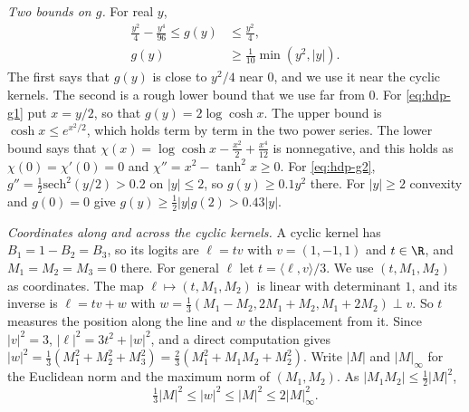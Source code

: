 \emph{Two bounds on $g$.} For real $y$,
\begin{align}
 \frac{y^2}4-\frac{y^4}{96}\le g(y)&\le\frac{y^2}4,\tag{g1}\label{eq:hdp-g1}\\
 g(y)&\ge\frac1{10}\min(y^2,|y|).\tag{g2}\label{eq:hdp-g2}
\end{align}
The first says that $g(y)$ is close to $y^2/4$ near $0$, and we use it near
the cyclic kernels. The second is a rough lower bound that we use far from
$0$. For \eqref{eq:hdp-g1} put $x=y/2$, so that $g(y)=2\log\cosh x$. The upper
bound is $\cosh x\le e^{x^2/2}$, which holds term by term in the two power
series. The lower bound says that
$\chi(x)=\log\cosh x-\frac{x^2}2+\frac{x^4}{12}$ is nonnegative, and this holds
as $\chi(0)=\chi'(0)=0$ and $\chi''=x^2-\tanh^2x\ge0$. For \eqref{eq:hdp-g2},
$g''=\frac12\mathrm{sech}^2(y/2)>0.2$ on $|y|\le2$, so $g(y)\ge0.1y^2$ there.
For $|y|\ge2$ convexity and $g(0)=0$ give $g(y)\ge\frac12|y|g(2)>0.43|y|$.

\emph{Coordinates along and across the cyclic kernels.} A cyclic kernel has
$B_1=1-B_2=B_3$, so its logits are $\ell=tv$ with $v=(1,-1,1)$ and $t\in\R$,
and $M_1=M_2=M_3=0$ there. For general $\ell$ let $t=\langle\ell,v\rangle/3$.
We use $(t,M_1,M_2)$ as coordinates. The map $\ell\mapsto(t,M_1,M_2)$ is
linear with determinant $1$, and its inverse is $\ell=tv+w$ with
$w=\frac13(M_1-M_2,2M_1+M_2,M_1+2M_2)\perp v$. So $t$ measures the position
along the line and $w$ the displacement from it. Since $|v|^2=3$,
$|\ell|^2=3t^2+|w|^2$, and a direct computation gives
$|w|^2=\frac13(M_1^2+M_2^2+M_3^2)=\frac23(M_1^2+M_1M_2+M_2^2)$. Write $|M|$
and $|M|_\infty$ for the Euclidean norm and the maximum norm of $(M_1,M_2)$.
As $\lvert M_1M_2\rvert\le\frac12|M|^2$,
\begin{equation}\label{eq:hdp-w}
 \tfrac13|M|^2\le|w|^2\le|M|^2\le2|M|_\infty^2.
\end{equation}

